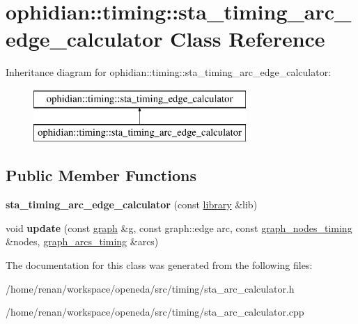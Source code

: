 \hypertarget{classophidian_1_1timing_1_1sta__timing__arc__edge__calculator}{\section{ophidian\-:\-:timing\-:\-:sta\-\_\-timing\-\_\-arc\-\_\-edge\-\_\-calculator Class Reference}
\label{classophidian_1_1timing_1_1sta__timing__arc__edge__calculator}
}
Inheritance diagram for ophidian\-:\-:timing\-:\-:sta\-\_\-timing\-\_\-arc\-\_\-edge\-\_\-calculator\-:\begin{figure}[H]
\begin{center}
\leavevmode
\includegraphics[height=2.000000cm]{classophidian_1_1timing_1_1sta__timing__arc__edge__calculator}
\end{center}
\end{figure}
\subsection*{Public Member Functions}
\begin{DoxyCompactItemize}
\item 
\hypertarget{classophidian_1_1timing_1_1sta__timing__arc__edge__calculator_aa2894632362a799075bec64cea5c0283}{{\bfseries sta\-\_\-timing\-\_\-arc\-\_\-edge\-\_\-calculator} (const \hyperlink{classophidian_1_1timing_1_1library}{library} \&lib)}\label{classophidian_1_1timing_1_1sta__timing__arc__edge__calculator_aa2894632362a799075bec64cea5c0283}

\item 
\hypertarget{classophidian_1_1timing_1_1sta__timing__arc__edge__calculator_a1d0e6c4d58f62b9c6fc7622d45b6e119}{void {\bfseries update} (const \hyperlink{classophidian_1_1timing_1_1graph}{graph} \&g, const graph\-::edge arc, const \hyperlink{classophidian_1_1timing_1_1graph__nodes__timing}{graph\-\_\-nodes\-\_\-timing} \&nodes, \hyperlink{classophidian_1_1timing_1_1graph__arcs__timing}{graph\-\_\-arcs\-\_\-timing} \&arcs)}\label{classophidian_1_1timing_1_1sta__timing__arc__edge__calculator_a1d0e6c4d58f62b9c6fc7622d45b6e119}

\end{DoxyCompactItemize}


The documentation for this class was generated from the following files\-:\begin{DoxyCompactItemize}
\item 
/home/renan/workspace/openeda/src/timing/sta\-\_\-arc\-\_\-calculator.\-h\item 
/home/renan/workspace/openeda/src/timing/sta\-\_\-arc\-\_\-calculator.\-cpp\end{DoxyCompactItemize}
